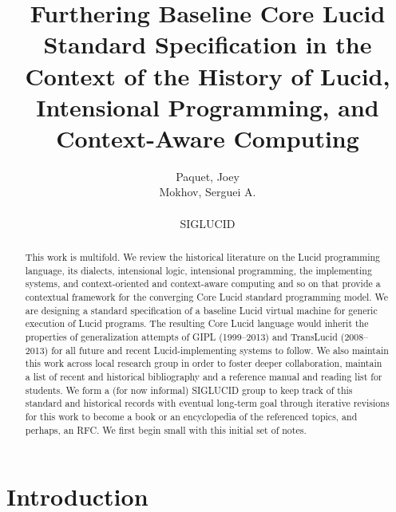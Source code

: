 \documentclass{easychair}
\newcommand{\gipl}{{GIPL\index{GIPL}}}
\newcommand{\lucid}{{Lucid\index{Lucid}}}
\newcommand{\translucid}{TransLucid\index{TransLucid}}
\begin{document}
\title{Furthering Baseline Core Lucid Standard Specification
       in the Context of the History of Lucid, Intensional Programming,
       and Context-Aware Computing}

{\author
	{
		Paquet, Joey\\
		Mokhov, Serguei A.\\\\SIGLUCID
	}
}

\maketitle




\begin{abstract}
This work is multifold. We review the historical literature on the {\lucid}
programming language, its dialects, intensional logic, intensional programming,
the implementing systems, and context-oriented and context-aware computing
and so on that provide a contextual framework for the converging Core Lucid
standard programming model.
We are designing a standard specification of a baseline {\lucid} virtual machine
for generic execution of Lucid programs. The resulting Core Lucid language
would inherit the properties of generalization attempts of {\gipl} (1999--2013)
and {\translucid} (2008--2013) for all future and recent Lucid-implementing
systems to follow.
We also maintain this work across local research group in order to
foster deeper collaboration, maintain a list of recent and historical bibliography
and a reference manual and reading list for students.
We form a (for now informal) SIGLUCID group to keep track of this standard and historical records
with eventual long-term goal through iterative revisions for this work to become
a book or an encyclopedia of the referenced topics, and perhaps, an RFC.
We first begin small with this initial set of notes.
\end{abstract}

\tableofcontents
\listoffigures
\lstlistoflistings
\listoftables

\section{Introduction}
\label{sect:introduction}
\end{document}
